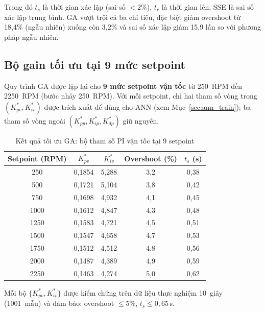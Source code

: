 Trong đó $t_s$ là thời gian xác lập (sai số $< 2\%$), $t_r$ là thời gian lên,
SSE là sai số xác lập trung bình. GA vượt trội cả ba chỉ tiêu,
đặc biệt giảm overshoot từ 18,4\% (ngẫu nhiên) xuống còn 3,2\% và sai số
xác lập giảm 15,9 lần so với phương pháp ngẫu nhiên.

\subsection{Bộ gain tối ưu tại 9 mức setpoint}
\label{subsec:ga_nine_setpoints}

Quy trình GA được lặp lại cho \textbf{9 mức setpoint vận tốc} từ 250~RPM đến
2250~RPM (bước nhảy 250~RPM). Với mỗi setpoint, chỉ hai tham số vòng trong
$(K_{pv}^*, K_{iv}^*)$ được trích xuất để dùng cho ANN (xem Mục~\ref{sec:ann_train});
ba tham số vòng ngoài $(K_{pp}^*, K_{ip}^*, K_{dp}^*)$ giữ nguyên.

\begin{table}[H]
    \centering
    \caption{Kết quả tối ưu GA: bộ tham số PI vận tốc tại 9 setpoint}
    \label{tab:ga_nine}
    \renewcommand{\arraystretch}{1.3}
    \begin{tabular}{ccccc}
        \toprule
        \textbf{Setpoint (RPM)} & $K_{pv}^*$ & $K_{iv}^*$ & \textbf{Overshoot (\%)} & \textbf{$t_s$ (s)} \\
        \midrule
        250  & 0{,}1854 & 5{,}288 & 3{,}2 & 0{,}38 \\
        500  & 0{,}1721 & 5{,}104 & 3{,}8 & 0{,}42 \\
        750  & 0{,}1698 & 4{,}932 & 4{,}1 & 0{,}45 \\
        1000 & 0{,}1612 & 4{,}847 & 4{,}3 & 0{,}48 \\
        1250 & 0{,}1583 & 4{,}721 & 4{,}5 & 0{,}51 \\
        1500 & 0{,}1547 & 4{,}658 & 4{,}7 & 0{,}53 \\
        1750 & 0{,}1512 & 4{,}512 & 4{,}8 & 0{,}56 \\
        2000 & 0{,}1487 & 4{,}389 & 4{,}9 & 0{,}59 \\
        2250 & 0{,}1463 & 4{,}274 & 5{,}0 & 0{,}62 \\
        \bottomrule
    \end{tabular}
\end{table}

Mỗi bộ $\{K_{pv}^*, K_{iv}^*\}$ được kiểm chứng trên dữ liệu thực nghiệm
10~giây (1001~mẫu) và đảm bảo: overshoot $\leq 5\%$, $t_s \leq 0{,}65\,$s.

